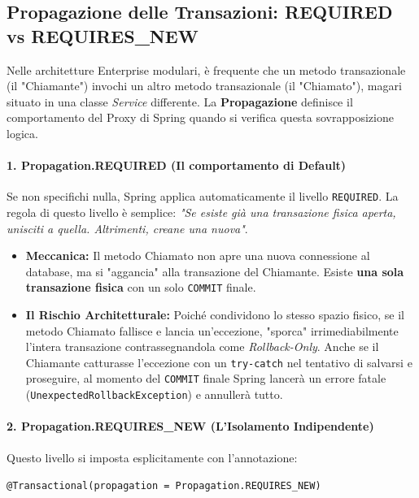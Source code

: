 \subsection{Propagazione delle Transazioni: REQUIRED vs REQUIRES\_NEW}

Nelle architetture Enterprise modulari, è frequente che un metodo transazionale (il "Chiamante") invochi un altro metodo transazionale (il "Chiamato"), magari situato in una classe \textit{Service} differente. 
La \textbf{Propagazione} definisce il comportamento del Proxy di Spring quando si verifica questa sovrapposizione logica.

\paragraph{1. Propagation.REQUIRED (Il comportamento di Default)}
Se non specifichi nulla, Spring applica automaticamente il livello \texttt{REQUIRED}. 
La regola di questo livello è semplice: \textit{"Se esiste già una transazione fisica aperta, unisciti a quella. Altrimenti, creane una nuova"}.
\begin{itemize}
    \item \textbf{Meccanica:} Il metodo Chiamato non apre una nuova connessione al database, ma si "aggancia" alla transazione del Chiamante. Esiste \textbf{una sola transazione fisica} con un solo \texttt{COMMIT} finale.
    \item \textbf{Il Rischio Architetturale:} Poiché condividono lo stesso spazio fisico, se il metodo Chiamato fallisce e lancia un'eccezione, "sporca" irrimediabilmente l'intera transazione contrassegnandola come \textit{Rollback-Only}. Anche se il Chiamante catturasse l'eccezione con un \texttt{try-catch} nel tentativo di salvarsi e proseguire, al momento del \texttt{COMMIT} finale Spring lancerà un errore fatale (\texttt{UnexpectedRollbackException}) e annullerà tutto.
\end{itemize}

\paragraph{2. Propagation.REQUIRES\_NEW (L'Isolamento Indipendente)}
Questo livello si imposta esplicitamente con l'annotazione: 

\begin{center}
    \texttt{@Transactional(propagation = Propagation.REQUIRES\_NEW)}
\end{center}

